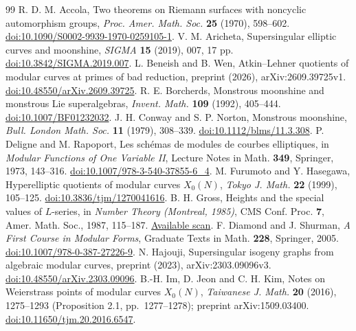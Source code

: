 \documentclass[11pt,a4paper]{article}
\theoremstyle{remark}\newtheorem{remark}[theorem]{Remark}
\numberwithin{equation}{section}
\begin{document}
	\begin{thebibliography}{99}\small
		 R. D. M. Accola, Two theorems on Riemann surfaces with noncyclic automorphism groups, \emph{Proc. Amer. Math. Soc.} \textbf{25} (1970), 598--602. \href{https://doi.org/10.1090/S0002-9939-1970-0259105-1}{doi:10.1090/S0002-9939-1970-0259105-1}.
		 V. M. Aricheta, Supersingular elliptic curves and moonshine, \emph{SIGMA} \textbf{15} (2019), 007, 17 pp. \href{https://doi.org/10.3842/SIGMA.2019.007}{doi:10.3842/SIGMA.2019.007}.
		 L. Beneish and B. Wen, Atkin--Lehner quotients of modular curves at primes of bad reduction, preprint (2026), arXiv:2609.39725v1. \href{https://doi.org/10.48550/arXiv.2609.39725}{doi:10.48550/arXiv.2609.39725}.
		 R. E. Borcherds, Monstrous moonshine and monstrous Lie superalgebras, \emph{Invent. Math.} \textbf{109} (1992), 405--444. \href{https://doi.org/10.1007/BF01232032}{doi:10.1007/BF01232032}.
		 J. H. Conway and S. P. Norton, Monstrous moonshine, \emph{Bull. London Math. Soc.} \textbf{11} (1979), 308--339. \href{https://doi.org/10.1112/blms/11.3.308}{doi:10.1112/blms/11.3.308}.
		 P. Deligne and M. Rapoport, Les sch\'emas de modules de courbes elliptiques, in \emph{Modular Functions of One Variable II}, Lecture Notes in Math. \textbf{349}, Springer, 1973, 143--316. \href{https://doi.org/10.1007/978-3-540-37855-6_4}{doi:10.1007/978-3-540-37855-6\_4}.
		 M. Furumoto and Y. Hasegawa, Hyperelliptic quotients of modular curves $X_0(N)$, \emph{Tokyo J. Math.} \textbf{22} (1999), 105--125. \href{https://doi.org/10.3836/tjm/1270041616}{doi:10.3836/tjm/1270041616}.
		 B. H. Gross, Heights and the special values of $L$-series, in \emph{Number Theory (Montreal, 1985)}, CMS Conf. Proc. \textbf{7}, Amer. Math. Soc., 1987, 115--187. \href{https://wstein.org/papers/bib/Gross-Heights_and_the_Special_Values_of_L-series.pdf}{Available scan}.
		 F. Diamond and J. Shurman, \emph{A First Course in Modular Forms}, Graduate Texts in Math. \textbf{228}, Springer, 2005. \href{https://doi.org/10.1007/978-0-387-27226-9}{doi:10.1007/978-0-387-27226-9}.
		 N. Hajouji, Supersingular isogeny graphs from algebraic modular curves, preprint (2023), arXiv:2303.09096v3. \href{https://doi.org/10.48550/arXiv.2303.09096}{doi:10.48550/arXiv.2303.09096}.
		 B.-H. Im, D. Jeon and C. H. Kim, Notes on Weierstrass points of modular curves $X_0(N)$, \emph{Taiwanese J. Math.} \textbf{20} (2016), 1275--1293 (Proposition 2.1, pp.~1277--1278); preprint arXiv:1509.03400. \href{https://doi.org/10.11650/tjm.20.2016.6547}{doi:10.11650/tjm.20.2016.6547}.

\end{thebibliography}
\end{document}
